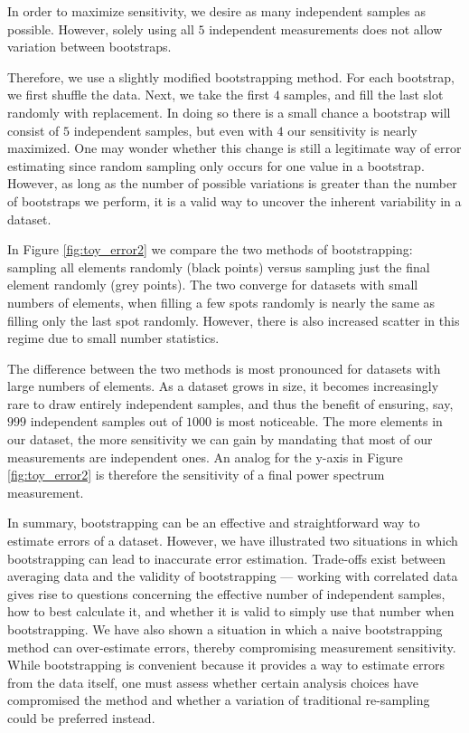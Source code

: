 \documentclass[preprint2,numberedappendix,tighten]{aastex6}  %
\begin{document}
In order to maximize sensitivity, we desire as many independent samples as possible. However, solely using all $5$ independent measurements does not allow variation between bootstraps. 

Therefore, we use a slightly modified bootstrapping method. For each bootstrap, we first shuffle the data. Next, we take the first $4$ samples, and fill the last slot randomly with replacement. In doing so there is a small chance a bootstrap will consist of $5$ independent samples, but even with $4$ our sensitivity is nearly maximized. One may wonder whether this change is still a legitimate way of error estimating since random sampling only occurs for one value in a bootstrap. However, as long as the number of possible variations is greater than the number of bootstraps we perform, it is a valid way to uncover the inherent variability in a dataset. 

In Figure \ref{fig:toy_error2} we compare the two methods of bootstrapping: sampling all elements randomly (black points) versus sampling just the final element randomly (grey points). The two converge for datasets with small numbers of elements, when filling a few spots randomly is nearly the same as filling only the last spot randomly. However, there is also increased scatter in this regime due to small number statistics. 

The difference between the two methods is most pronounced for datasets with large numbers of elements. As a dataset grows in size, it becomes increasingly rare to draw entirely independent samples, and thus the benefit of ensuring, say, $999$ independent samples out of $1000$ is most noticeable. The more elements in our dataset, the more sensitivity we can gain by mandating that most of our measurements are independent ones. An analog for the y-axis in Figure \ref{fig:toy_error2} is therefore the sensitivity of a final power spectrum measurement.

In summary, bootstrapping can be an effective and straightforward way to estimate errors of a dataset. However, we have illustrated two situations in which bootstrapping can lead to inaccurate error estimation. Trade-offs exist between averaging data and the validity of bootstrapping --- working with correlated data gives rise to questions concerning the effective number of independent samples, how to best calculate it, and whether it is valid to simply use that number when bootstrapping. We have also shown a situation in which a naive bootstrapping method can over-estimate errors, thereby compromising measurement sensitivity. While bootstrapping is convenient because it provides a way to estimate errors from the data itself, one must assess whether certain analysis choices have compromised the method and whether a variation of traditional re-sampling could be preferred instead.
\end{document}
